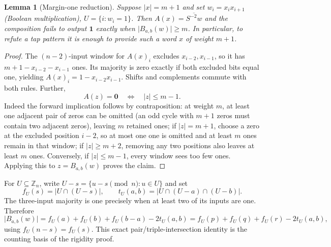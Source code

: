 \documentclass[11pt,a4paper]{article}
\newtheorem{lemma}[theorem]{Lemma}
\newcommand{\wt}[1]{\lvert #1\rvert}
\newcommand{\cZ}{\mathbb Z}
\newcommand{\ind}{\boldsymbol{1}}
\begin{document}
\begin{lemma}[Margin-one reduction]\label{lem:reduction}
Suppose $\wt{x}=m+1$ and set $w_i=x_ix_{i+1}$ (Boolean multiplication), $U=\{i:w_i=1\}$. Then $A(x)=\overline{S^{-2}w}$ and the composition fails to output $\ind$ exactly when $\wt{B_{a,b}(w)}\ge m$. In particular, to refute a tap pattern it is enough to provide such a word $x$ of weight $m+1$.
\end{lemma}
\begin{proof}
The $(n-2)$-input window for $A(x)_i$ excludes $x_{i-2},x_{i-1}$, so it has $m+1-x_{i-2}-x_{i-1}$ ones. Its majority is zero exactly if both excluded bits equal one, yielding $A(x)_i=1-x_{i-2}x_{i-1}$. Shifts and complements commute with both rules. Further,
\begin{equation}\label{eq:outer-zero}
 A(z)=\mathbf 0\quad\Longleftrightarrow\quad \wt{z}\le m-1.
\end{equation}
Indeed the forward implication follows by contraposition: at weight $m$, at least one adjacent pair of zeros can be omitted (an odd cycle with $m+1$ zeros must contain two adjacent zeros), leaving $m$ retained ones; if $\wt{z}=m+1$, choose a zero at the excluded position $i-2$, so at most one one is omitted and at least $m$ ones remain in that window; if $\wt{z}\ge m+2$, removing any two positions also leaves at least $m$ ones. Conversely, if $\wt{z}\le m-1$, every window sees too few ones. Applying this to $z=B_{a,b}(w)$ proves the claim.
\end{proof}

For $U\subseteq\cZ_n$, write $U-s=\{u-s\pmod n:u\in U\}$ and set
\begin{equation}\label{eq:correlation}
 f_U(s)=\wt{U\cap(U-s)},\qquad t_U(a,b)=\wt{U\cap(U-a)\cap(U-b)}.
\end{equation}
The three-input majority is one precisely when at least two of its inputs are one. Therefore
\begin{equation}\label{eq:intersection}
 \wt{B_{a,b}(w)}=f_U(a)+f_U(b)+f_U(b-a)-2t_U(a,b)
 =f_U(p)+f_U(q)+f_U(r)-2t_U(a,b),
\end{equation}
using $f_U(n-s)=f_U(s)$. This exact pair/triple-intersection identity is the counting basis of the rigidity proof.
\end{document}
